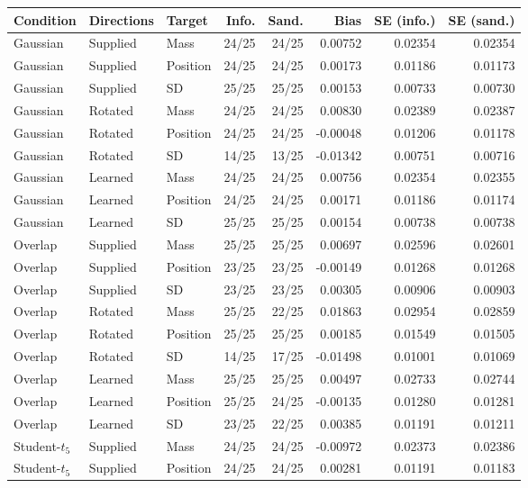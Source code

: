 \begin{tabular}{@{}lllrrrrr@{}}
\toprule
Condition & Directions & Target & Info. & Sand. & Bias & SE (info.) & SE (sand.) \\
\midrule
Gaussian & Supplied & Mass & 24/25 & 24/25 & 0.00752 & 0.02354 & 0.02354 \\
Gaussian & Supplied & Position & 24/25 & 24/25 & 0.00173 & 0.01186 & 0.01173 \\
Gaussian & Supplied & SD & 25/25 & 25/25 & 0.00153 & 0.00733 & 0.00730 \\
\addlinespace[3pt]
Gaussian & Rotated & Mass & 24/25 & 24/25 & 0.00830 & 0.02389 & 0.02387 \\
Gaussian & Rotated & Position & 24/25 & 24/25 & -0.00048 & 0.01206 & 0.01178 \\
Gaussian & Rotated & SD & 14/25 & 13/25 & -0.01342 & 0.00751 & 0.00716 \\
\addlinespace[3pt]
Gaussian & Learned & Mass & 24/25 & 24/25 & 0.00756 & 0.02354 & 0.02355 \\
Gaussian & Learned & Position & 24/25 & 24/25 & 0.00171 & 0.01186 & 0.01174 \\
Gaussian & Learned & SD & 25/25 & 25/25 & 0.00154 & 0.00738 & 0.00738 \\
\addlinespace[3pt]
Overlap & Supplied & Mass & 25/25 & 25/25 & 0.00697 & 0.02596 & 0.02601 \\
Overlap & Supplied & Position & 23/25 & 23/25 & -0.00149 & 0.01268 & 0.01268 \\
Overlap & Supplied & SD & 23/25 & 23/25 & 0.00305 & 0.00906 & 0.00903 \\
\addlinespace[3pt]
Overlap & Rotated & Mass & 25/25 & 22/25 & 0.01863 & 0.02954 & 0.02859 \\
Overlap & Rotated & Position & 25/25 & 25/25 & 0.00185 & 0.01549 & 0.01505 \\
Overlap & Rotated & SD & 14/25 & 17/25 & -0.01498 & 0.01001 & 0.01069 \\
\addlinespace[3pt]
Overlap & Learned & Mass & 25/25 & 25/25 & 0.00497 & 0.02733 & 0.02744 \\
Overlap & Learned & Position & 25/25 & 24/25 & -0.00135 & 0.01280 & 0.01281 \\
Overlap & Learned & SD & 23/25 & 22/25 & 0.00385 & 0.01191 & 0.01211 \\
\addlinespace[3pt]
Student-$t_5$ & Supplied & Mass & 24/25 & 24/25 & -0.00972 & 0.02373 & 0.02386 \\
Student-$t_5$ & Supplied & Position & 24/25 & 24/25 & 0.00281 & 0.01191 & 0.01183 \\

\end{tabular}
